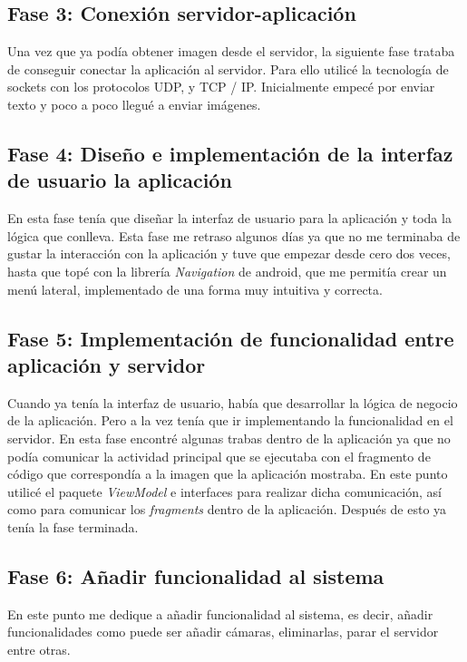 \subsection{Fase 3: Conexión servidor-aplicación}

Una vez que ya podía obtener imagen desde el servidor, la siguiente fase trataba de conseguir conectar la aplicación al servidor.
Para ello utilicé la tecnología de sockets con los protocolos UDP, y TCP / IP.
Inicialmente empecé por enviar texto y poco a poco llegué a enviar imágenes.

\subsection{Fase 4: Diseño e implementación de la interfaz de usuario la aplicación}

En esta fase tenía que diseñar la interfaz de usuario para la aplicación y toda la lógica que conlleva. 
Esta fase me retraso algunos días ya que no me terminaba de gustar la interacción con la aplicación y tuve que empezar desde cero dos veces, hasta que topé con la librería \textit{Navigation} de android, que me permitía crear un menú lateral, implementado de una forma muy intuitiva y correcta.

\subsection{Fase 5: Implementación de funcionalidad entre aplicación y servidor}

Cuando ya tenía la interfaz de usuario, había que desarrollar la lógica de negocio de la aplicación. 
Pero a la vez tenía que ir implementando la funcionalidad en el servidor.
En esta fase encontré algunas trabas dentro de la aplicación ya que no podía comunicar la actividad principal que se ejecutaba con el fragmento de código que correspondía a la imagen que la aplicación mostraba.
En este punto utilicé el paquete \textit{ViewModel} e interfaces para realizar dicha comunicación, así como para comunicar los \textit{fragments} dentro de la aplicación.
Después de esto ya tenía la fase terminada.

\subsection{Fase 6: Añadir funcionalidad al sistema}

En este punto me dedique a añadir funcionalidad al sistema, es decir, añadir funcionalidades como puede ser añadir cámaras, eliminarlas, parar el servidor entre otras.

